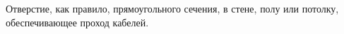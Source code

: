 Отверстие, как правило, прямоугольного сечения, в стене, 
полу или потолку, обеспечивающее проход кабелей.
